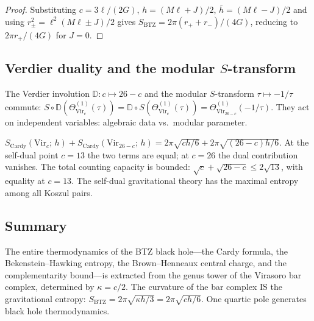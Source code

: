 \documentclass[11pt]{article}
\begin{document}
\begin{proof}
Substituting $c = 3\ell/(2G)$, $h = (M\ell+J)/2$,
$\bar h = (M\ell-J)/2$ and using
$r_\pm^2 = \ell^2(M\ell \pm J)/2$ gives
$S_{\mathrm{BTZ}} = 2\pi(r_+ + r_-)/(4G)$, reducing to
$2\pi r_+/(4G)$ for $J = 0$.
\end{proof}

\subsection{Verdier duality and the modular $S$-transform}
\label{subsec:btz-verdier-modular}

\begin{proposition}
\label{prop:btz-D-S-commute-wn}
The Verdier involution $\mathbb{D}\colon c \mapsto 26-c$ and the
modular $S$-transform $\tau \mapsto -1/\tau$ commute:
$S \circ \mathbb{D}(\Theta_{\mathrm{Vir}_c}^{(1)}(\tau))
= \mathbb{D} \circ S(\Theta_{\mathrm{Vir}_c}^{(1)}(\tau))
= \Theta_{\mathrm{Vir}_{26-c}}^{(1)}(-1/\tau)$.
They act on independent variables: algebraic data vs.\ modular
parameter.
\end{proposition}

\begin{theorem}
\label{thm:btz-paired-cardy-wn}
$S_{\mathrm{Cardy}}(\mathrm{Vir}_c;\,h)
+ S_{\mathrm{Cardy}}(\mathrm{Vir}_{26-c};\,h)
= 2\pi\sqrt{ch/6} + 2\pi\sqrt{(26-c)h/6}$.
At the self-dual point $c = 13$ the two terms are equal;
at $c = 26$ the dual contribution vanishes.
The total counting capacity is bounded:
$\sqrt{c} + \sqrt{26-c} \le 2\sqrt{13}$, with equality at
$c = 13$.  The self-dual gravitational theory has the maximal
entropy among all Koszul pairs.
\end{theorem}

\subsection{Summary}

The entire thermodynamics of the BTZ black hole---the Cardy
formula, the Bekenstein--Hawking entropy, the Brown--Henneaux
central charge, and the complementarity bound---is extracted
from the genus tower of the Virasoro bar complex, determined by
$\kappa = c/2$.  The curvature of the bar complex IS the
gravitational entropy:
$S_{\mathrm{BTZ}} = 2\pi\sqrt{\kappa h/3} = 2\pi\sqrt{ch/6}$.
One quartic pole generates black hole thermodynamics.
\end{document}
